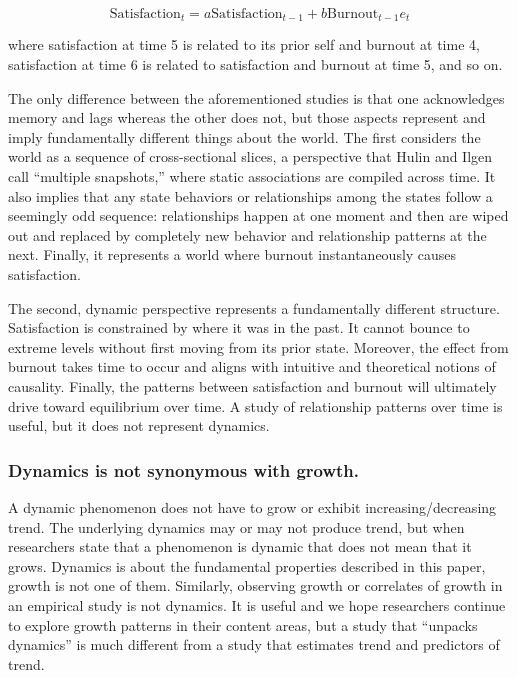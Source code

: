 \documentclass[english,,man]{apa6}
\theoremstyle{definition}
\theoremstyle{definition}
\theoremstyle{definition}
\theoremstyle{remark}
\begin{document}
\begin{equation}
\textrm{Satisfaction}_{t} = a \textrm{Satisfaction}_{t - 1} + b \textrm{Burnout}_{t - 1} e_{t}
\end{equation}

\noindent where satisfaction at time 5 is related to its prior self and
burnout at time 4, satisfaction at time 6 is related to satisfaction and
burnout at time 5, and so on.

The only difference between the aforementioned studies is that one
acknowledges memory and lags whereas the other does not, but those
aspects represent and imply fundamentally different things about the
world. The first considers the world as a sequence of cross-sectional
slices, a perspective that Hulin and Ilgen call \enquote{multiple
snapshots,} where static associations are compiled across time. It also
implies that any state behaviors or relationships among the states
follow a seemingly odd sequence: relationships happen at one moment and
then are wiped out and replaced by completely new behavior and
relationship patterns at the next. Finally, it represents a world where
burnout instantaneously causes satisfaction.

The second, dynamic perspective represents a fundamentally different
structure. Satisfaction is constrained by where it was in the past. It
cannot bounce to extreme levels without first moving from its prior
state. Moreover, the effect from burnout takes time to occur and aligns
with intuitive and theoretical notions of causality. Finally, the
patterns between satisfaction and burnout will ultimately drive toward
equilibrium over time. A study of relationship patterns over time is
useful, but it does not represent dynamics.

\hypertarget{dynamics-is-not-synonymous-with-growth.}{%
\subsubsection{Dynamics is not synonymous with
growth.}\label{dynamics-is-not-synonymous-with-growth.}}

A dynamic phenomenon does not have to grow or exhibit
increasing/decreasing trend. The underlying dynamics may or may not
produce trend, but when researchers state that a phenomenon is dynamic
that does not mean that it grows. Dynamics is about the fundamental
properties described in this paper, growth is not one of them.
Similarly, observing growth or correlates of growth in an empirical
study is not dynamics. It is useful and we hope researchers continue to
explore growth patterns in their content areas, but a study that
\enquote{unpacks dynamics} is much different from a study that estimates
trend and predictors of trend.
\end{document}
